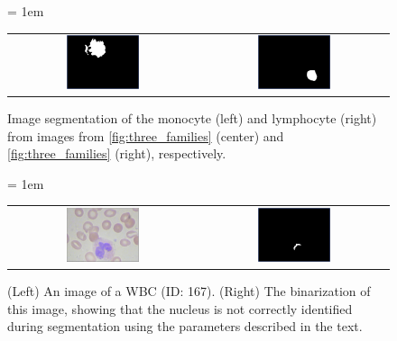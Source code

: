 \begin{figure}[h]
\centering
\tabcolsep = 1em
\mySfFamily
\begin{tabular}{c c}
\includegraphics[width = 0.4\textwidth]{../images/monocyte_binarized.png} & \includegraphics[width = 0.4\textwidth]{../images/lymphocyte_binarized.png}
\end{tabular}
\caption{Image segmentation of the monocyte (left) and lymphocyte (right) from images from \autoref{fig:three_families} (center) and \autoref{fig:three_families} (right), respectively.}
\label{fig:segmentation}
\end{figure}

\begin{figure}[h]
\centering
\tabcolsep = 1em
\mySfFamily
\begin{tabular}{c c}
\includegraphics[width = 0.4\textwidth]{../images/WBC_167.png} & \includegraphics[width = 0.4\textwidth]{../images/WBC_167_segmentation.png}
\end{tabular}
\caption{(Left) An image of a WBC (ID: 167). (Right) The binarization of this image, showing that the nucleus is not correctly identified during segmentation using the parameters described in the text.}
\label{fig:segmentation_imperfect}
\end{figure}


